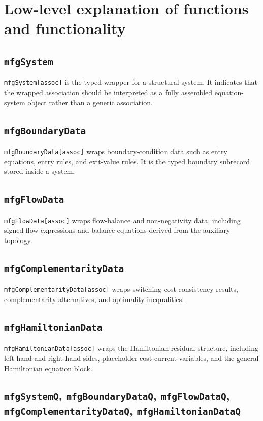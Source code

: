 \documentclass[11pt]{article}
\begin{document}
\section{Low-level explanation of functions and functionality}

\subsection*{\texttt{mfgSystem}}

\texttt{mfgSystem[assoc]} is the typed wrapper for a structural system. It indicates that the wrapped association should be interpreted as a fully assembled equation-system object rather than a generic association.

\subsection*{\texttt{mfgBoundaryData}}

\texttt{mfgBoundaryData[assoc]} wraps boundary-condition data such as entry equations, entry rules, and exit-value rules. It is the typed boundary subrecord stored inside a system.

\subsection*{\texttt{mfgFlowData}}

\texttt{mfgFlowData[assoc]} wraps flow-balance and non-negativity data, including signed-flow expressions and balance equations derived from the auxiliary topology.

\subsection*{\texttt{mfgComplementarityData}}

\texttt{mfgComplementarityData[assoc]} wraps switching-cost consistency results, complementarity alternatives, and optimality inequalities.

\subsection*{\texttt{mfgHamiltonianData}}

\texttt{mfgHamiltonianData[assoc]} wraps the Hamiltonian residual structure, including left-hand and right-hand sides, placeholder cost-current variables, and the general Hamiltonian equation block.

\subsection*{\texttt{mfgSystemQ}, \texttt{mfgBoundaryDataQ}, \texttt{mfgFlowDataQ}, \texttt{mfgComplementarityDataQ}, \texttt{mfgHamiltonianDataQ}}
\end{document}
